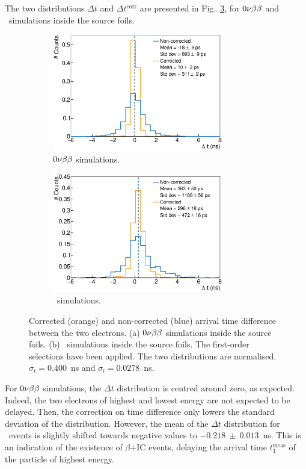 The two distributions $\Delta t$ and $\Delta t^{\text{corr}}$ are presented in Fig.~\ref{fig:delta_t}, for $0\nu\beta\beta$ and \Tl\ simulations inside the source foils.
\begin{figure}[!h]
\centering
\begin{subfigure}[t]{1.\textwidth}
  \centering
  \includegraphics[width=0.82\textwidth]{timedifference/fig_timediff/0nubb_delta_t.eps}
  \captionsetup{justification=justified}
  \caption{$0\nu\beta\beta$ simulations.
    \label{subfig:0nubb_delta_t}}
\end{subfigure}
\hfill
\begin{subfigure}[t]{1.\textwidth}
  \centering
  \includegraphics[width=0.82\textwidth]{timedifference/fig_timediff/208Tl_delta_t.eps}
  \captionsetup{justification=justified}
  \caption{\Tl\ simulations.
    \label{subfig:208Tl_delta_t}}
\end{subfigure}
\caption{Corrected (orange) and non-corrected (blue) arrival time difference between the two electrons.
  (a) $0\nu\beta\beta$ simulations inside the source foils.
  (b) \Tl\ simulations inside the source foils.
  The first-order selections have been applied.
  The two distributions are normalised.
  $\sigma_{t}=0.400$~ns and $\sigma_{l}=0.0278$~ns.
  \label{fig:delta_t}}
\end{figure}
For $0\nu\beta\beta$ simulations, the $\Delta t$ distribution is centred around zero, as expected.
Indeed, the two electrons of highest and lowest energy are not expected to be delayed.
Then, the correction on time difference only lowers the standard deviation of the distribution.
However, the mean of the $\Delta t$ distribution for \Tl\ events is slightly shifted towards negative values to $-0.218~\pm~0.013$~ns.
This is an indication of the existence of $\beta$+IC events, delaying the arrival time $t^{\text{meas}}_{1}$ of the particle of highest energy.

